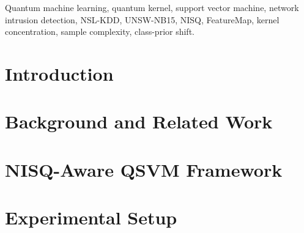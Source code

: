 \begin{abstract}
\begin{revbody}
where the two arms overlap the tree ensembles lead under both priors. The selection rule transfers to
UNSW-NB15 unchanged and returns six qubits rather than four, while the
sample-complexity reversal does not transfer. Finally, spending a larger feature
budget forces a wider circuit, and widening destroys the kernel: at eight qubits
all 48 paired comparisons favour the classical model, with a mechanism visible
directly in the Gram matrix, whose off-diagonal dispersion decays faster for the
\ZZ{} map than for its entanglement-free control, by the factor of two that
phase-term counting predicts at $K=20$ and by 3.3 at $K=80$, where the collapse
occurs. We report the result as a regime map, including the regimes in which the
quantum kernel loses.
\end{revbody}
\end{abstract}

\begin{IEEEkeywords}
Quantum machine learning, quantum kernel, support vector machine, network
intrusion detection, NSL-KDD, UNSW-NB15, NISQ, \ZZ{}FeatureMap, kernel
concentration, sample complexity, class-prior shift.
\end{IEEEkeywords}

\section{Introduction}
\label{sec:intro}


\section{Background and Related Work}
\label{sec:related}

\section{NISQ-Aware QSVM Framework}
\label{sec:framework}

\section{Experimental Setup}
\label{sec:setup}


